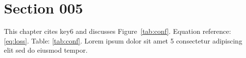 \section{Section 005}\label{sec:s5}
This chapter cites key6 and discusses Figure~\ref{tab:conf}.
Equation reference: \eqref{eq:loss}. Table: \ref{tab:conf}.
Lorem ipsum dolor sit amet 5 consectetur adipiscing elit sed do eiusmod tempor.
